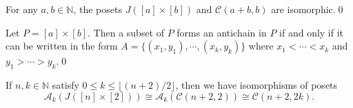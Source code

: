 \documentclass[10pt,a4paper]{amsart}
\newcommand{\N}{\mathbb{N}}
\newcommand{\cala}{\mathcal{A}}
\newcommand{\calc}{\mathcal{C}}
\begin{document}
\begin{proposition}\label{prop:jab_iso}
For any $a,b\in \N$, the posets  $J([a] \times [b])$ and $\calc(a+b, b)$ are
isomorphic.\qed 
\end{proposition}

\begin{lemma}
\label{lem:jab_antichain}
Let $P=[a]\times[b]$. Then a subset of $P$ forms an antichain in $P$ if and
only if it can be written in the form $A=\{(x_1,y_1), \cdots, (x_k,y_k)\}$ where
$x_1 < \cdots < x_k$ and $y_1 > \cdots > y_k$.\qed
\end{lemma}

\begin{proposition}
    \label{prop:Dspin}
    If $n,k\in \N$ satisfy $0\le k\le \lfloor (n+2)/2\rfloor$, then we have
    isomorphisms of posets \[ \cala_k(J([n]\times[2]))\cong
    \cala_k(\calc(n+2,2))\cong \calc(n+2,2k).  \]
\end{proposition}
\end{document}
